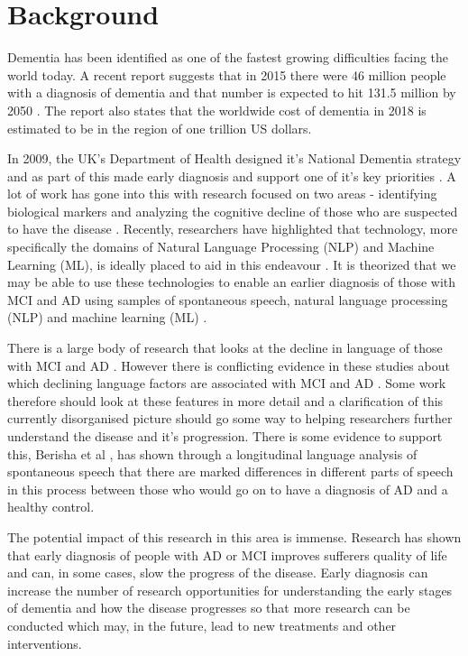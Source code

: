 \documentclass[10pt]{article}
\begin{document}
\section{Background}
Dementia has been identified as one of the fastest growing difficulties facing the world today. A recent report suggests that in 2015 there were 46 million people with a diagnosis of dementia and that number is expected to hit 131.5 million by 2050 \cite{Prince2015}. The report also states that the worldwide cost of dementia in 2018 is estimated to be in the region of one trillion US dollars.
\par
In 2009, the UK's Department of Health designed it's National Dementia strategy and as part of this made early diagnosis and support one of it's key priorities \cite{England2009}. A lot of work has gone into this with research focused on two areas - identifying biological markers and analyzing the cognitive decline of those who are suspected to have the disease \cite{Taler2008}. Recently, researchers have highlighted that technology, more specifically the domains of Natural Language Processing (NLP) and Machine Learning (ML), is ideally placed to aid in this endeavour \cite{Boschi2017}. It is theorized that we may be able to use these technologies to enable an earlier diagnosis of those with MCI and AD using samples of spontaneous speech, natural language processing (NLP) and machine learning (ML) \cite{Orimaye2014, Boschi2017}.
\par
There is a large body of research that looks at the decline in language of those with MCI and AD \cite{Taler2008, Boschi2017, Emery2000}. However there is conflicting evidence in these studies about which declining language factors are associated with MCI and AD \cite{Taler2008, Boschi2017}. Some work therefore should look at these features in more detail and a clarification of this currently disorganised picture should go some way to helping researchers further understand the disease and it's progression. There is some evidence to support this, Berisha et al \cite{Berisha2015}, has shown through a longitudinal language analysis of spontaneous speech that there are marked differences in different parts of speech in this process between those who would go on to have a diagnosis of AD and a healthy control. 
\par
The potential impact of this research in this area is immense. Research has shown that early diagnosis of people with AD or MCI improves sufferers quality of life and can, in some cases, slow the progress of the disease. Early diagnosis can increase the number of research opportunities for understanding the early stages of dementia and how the disease progresses so that more research can be conducted which may, in the future, lead to new treatments and other interventions.
\end{document}
